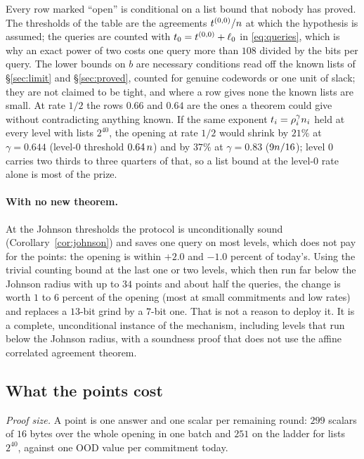 Every row marked ``open'' is conditional on a list bound that nobody has proved. The thresholds of the table are the agreements $t^{(0,0)}/n$ at which the hypothesis is assumed; the queries are counted with $t_0=t^{(0,0)}+\ell_0$ in \eqref{eq:queries}, which is why an exact power of two costs one query more than $108$ divided by the bits per query. The lower bounds on $b$ are necessary conditions read off the known lists of \S\ref{sec:limit} and \S\ref{sec:proved}, counted for genuine codewords or one unit of slack; they are not claimed to be tight, and where a row gives none the known lists are small. At rate $1/2$ the rows $0.66$ and $0.64$ are the ones a theorem could give without contradicting anything known. If the same exponent $t_i=\rho_i^{\gamma}n_i$ held at every level with lists $2^{40}$, the opening at rate $1/2$ would shrink by $21\%$ at $\gamma=0.644$ (level-$0$ threshold $0.64\,n$) and by $37\%$ at $\gamma=0.83$ ($9n/16$); level $0$ carries two thirds to three quarters of that, so a list bound at the level-$0$ rate alone is most of the prize.

\paragraph{With no new theorem.} At the Johnson thresholds the protocol is unconditionally sound (Corollary~\ref{cor:johnson}) and saves one query on most levels, which does not pay for the points: the opening is within $+2.0$ and $-1.0$ percent of today's. Using the trivial counting bound at the last one or two levels, which then run far below the Johnson radius with up to $34$ points and about half the queries, the change is worth $1$ to $6$ percent of the opening (most at small commitments and low rates) and replaces a $13$-bit grind by a $7$-bit one. That is not a reason to deploy it. It is a complete, unconditional instance of the mechanism, including levels that run below the Johnson radius, with a soundness proof that does not use the affine correlated agreement theorem.

\subsection{What the points cost}\label{sec:cost}

\emph{Proof size.} A point is one answer and one scalar per remaining round: $299$ scalars of $16$ bytes over the whole opening in one batch and $251$ on the ladder for lists $2^{40}$, against one OOD value per commitment today.

